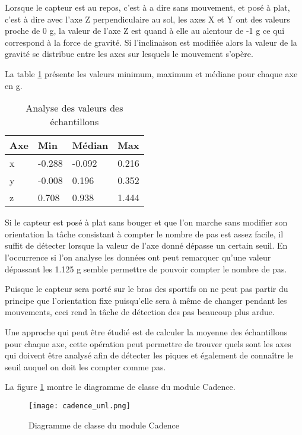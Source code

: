 Lorsque le capteur est au repos, c'est à a dire sans mouvement, et posé à plat, c'est à dire avec l'axe Z perpendiculaire au sol, les axes X et Y ont des valeurs proche de 0 g, la valeur de l'axe Z est quand à elle au alentour de -1 g ce qui correspond à la force de gravité. Si l'inclinaison est modifiée alors la valeur de la gravité se distribue entre les axes sur lesquels le mouvement s'opère.

La table \ref{tab:analysis_samples} présente les valeurs minimum, maximum et médiane pour chaque axe en g.

\begin{table}[htb]
\caption{Analyse des valeurs des échantillons}
\label{tab:analysis_samples}
\centering
\begin{tabular}{ l l l l }
\toprule
Axe & Min & Médian & Max \\
\midrule
x & -0.288 & -0.092 & 0.216 \\
y & -0.008 & 0.196 & 0.352 \\
z & 0.708 & 0.938 & 1.444 \\
\bottomrule 
\end{tabular}
\end{table}

Si le capteur est posé à plat sans bouger et que l'on marche sans modifier son orientation la tâche consistant à compter le nombre de pas est assez facile, il suffit de détecter lorsque la valeur de l'axe donné dépasse un certain seuil. En l'occurrence si l'on analyse les données ont peut remarquer qu'une valeur dépassant les 1.125 g semble permettre de pouvoir compter le nombre de pas.

Puisque le capteur sera porté sur le bras des sportifs on ne peut pas partir du principe que l'orientation fixe puisqu'elle sera à même de changer pendant les mouvements, ceci rend la tâche de détection des pas beaucoup plus ardue.

Une approche qui peut être étudié est de calculer la moyenne des échantillons pour chaque axe, cette opération peut permettre de trouver quels sont les axes qui doivent être analysé afin de détecter les piques et également de connaître le seuil auquel on doit les compter comme pas.

La figure \ref{fig:cadence_uml} montre le diagramme de classe du module Cadence.

\begin{figure}[htb]
\centering 
\texttt{[image: cadence\_uml.png]} 
\caption{Diagramme de classe du module Cadence}
\label{fig:cadence_uml}
\end{figure}

